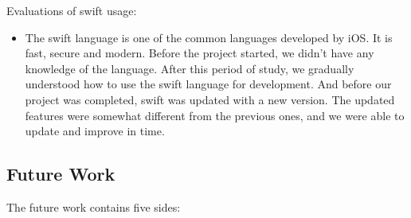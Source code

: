 \noindent Evaluations of swift usage:
\begin{itemize}
    \item The swift language is one of the common languages developed by iOS. It is fast, secure and modern. Before the project started, we didn't have any knowledge of the language. After this period of study, we gradually understood how to use the swift language for development. And before our project was completed, swift was updated with a new version. The updated features were somewhat different from the previous ones, and we were able to update and improve in time.
\end{itemize}


\subsection{Future Work}

\noindent The future work contains five sides:

